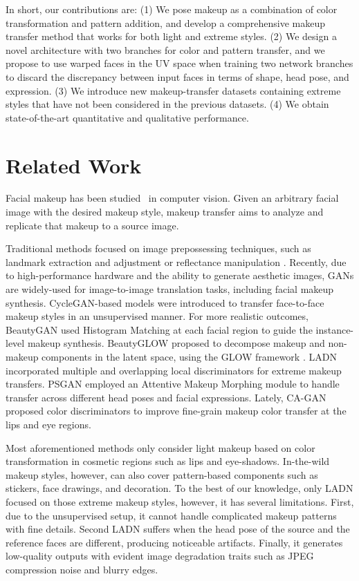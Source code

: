 \documentclass[final]{cvpr}
\begin{document}
In short, our contributions are: (1) We pose makeup as a combination of color transformation and pattern addition, and develop a comprehensive makeup transfer method that works for both light and extreme styles. (2) We design a novel architecture with two branches for color and pattern transfer, and we propose to use warped faces in the UV space when training two network branches to discard the discrepancy between input faces in terms of shape, head pose, and expression. (3) We introduce new makeup-transfer datasets containing extreme styles that have not been considered in the previous datasets. (4) We obtain state-of-the-art quantitative and qualitative performance.


\section{Related Work} \label{sec:related_makeup}
\vspace{-2mm}
 Facial makeup has been studied~\cite{overview_makeup} in computer vision. Given an arbitrary facial image with the desired makeup style, makeup transfer aims to analyze and replicate that makeup to a source image. 

Traditional methods \cite{image_anatogy,example_comestic} focused on image prepossessing techniques, such as landmark extraction and adjustment \cite{makeup_landmark} or reflectance manipulation \cite{makeup_physic}. Recently, due to high-performance hardware and the ability to generate aesthetic images, GANs are widely-used for image-to-image translation tasks, including facial makeup synthesis. CycleGAN-based models \cite{CycleGAN2017,Chang2018PairedCycleGANAS} were introduced to transfer face-to-face makeup styles in an unsupervised manner. For more realistic outcomes, BeautyGAN \cite{beautygan} used Histogram Matching at each facial region to guide the instance-level makeup synthesis. BeautyGLOW \cite{beautyglow} proposed to decompose makeup and non-makeup components in the latent space, using the GLOW framework \cite{glow}. LADN \cite{gu2019ladn} incorporated multiple and overlapping local discriminators for extreme makeup transfers. PSGAN \cite{jiang2019psgan} employed an Attentive Makeup Morphing module to handle transfer across different head poses and facial expressions. Lately, CA-GAN \cite{kips2020cagan} proposed color discriminators to improve fine-grain makeup color transfer at the lips and eye regions.

Most aforementioned methods only consider light makeup based on color transformation in cosmetic regions such as lips and eye-shadows. In-the-wild makeup styles, however, can also cover pattern-based components such as stickers, face drawings, and decoration. To the best of our knowledge, only LADN \cite{gu2019ladn} focused on those extreme makeup styles, however, it has several limitations. First, due to the unsupervised setup, it cannot handle complicated makeup patterns with fine details. Second LADN suffers when the head pose of the source and the reference faces are different, producing noticeable artifacts. Finally, it generates low-quality outputs with evident image degradation traits such as JPEG compression noise and blurry edges.
\end{document}
